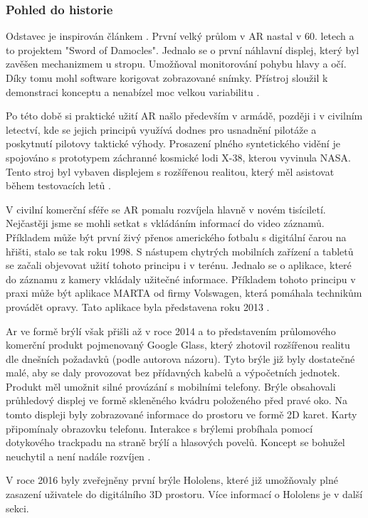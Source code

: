 \subsubsection{Pohled do historie}
Odstavec je inspirován článkem \cite{historyAr}. První velký průlom v AR nastal v 60. letech a to projektem "Sword of Damocles". Jednalo se o první náhlavní displej, který byl zavěšen mechanizmem u stropu. Umožňoval monitorování pohybu hlavy a očí. Díky tomu mohl software korigovat zobrazované snímky. Přístroj sloužil k demonstraci konceptu a nenabízel moc velkou variabilitu \cite{Kniha1GreengardSamuel2019Vr}.

Po této době si praktické užití AR našlo především v armádě, později i v civilním letectví, kde se jejich principů využívá dodnes pro usnadnění pilotáže a poskytnutí pilotovy taktické výhody. Prosazení plného syntetického vidění je spojováno s prototypem záchranné kosmické lodi X-38, kterou vyvinula NASA. Tento stroj byl vybaven displejem s rozšířenou realitou, který měl asistovat během testovacích letů \cite{delgado2001hybrid}.

V civilní komerční sféře se AR pomalu rozvíjela hlavně v novém tisíciletí. Nejčastěji jsme se mohli setkat s vkládáním informací do video záznamů. Příkladem může být první živý přenos amerického fotbalu s digitální čarou na hřišti, stalo se tak roku 1998. S nástupem chytrých mobilních zařízení a tabletů se začali objevovat užití tohoto principu i v terénu. Jednalo se o aplikace, které do záznamu z kamery vkládaly užitečné informace. Příkladem tohoto principu v praxi může být aplikace MARTA od firmy Volswagen, která pomáhala technikům provádět opravy. Tato aplikace byla představena roku 2013 \cite{MartaArt}.

Ar ve formě brýlí však přišli až v roce 2014 a to představením průlomového komerční produkt pojmenovaný Google Glass, který zhotovil rozšířenou realitu dle dnešních požadavků (podle autorova názoru). Tyto brýle již byly dostatečné malé, aby se daly provozovat bez přídavných kabelů a výpočetních jednotek. Produkt měl umožnit silné provázání s mobilními telefony. Brýle obsahovali průhledový displej ve formě skleněného kvádru položeného před pravé oko. 
Na tomto displeji byly zobrazované informace do prostoru ve formě 2D karet. Karty připomínaly obrazovku telefonu. Interakce s brýlemi probíhala pomocí dotykového trackpadu na straně brýlí a hlasových povelů. Koncept se bohužel neuchytil a není nadále rozvíjen \cite{GoogleGlass}.

V roce 2016 byly zveřejněny první brýle Hololens, které již umožňovaly plné zasazení uživatele do digitálního 3D prostoru. Více informací o Hololens je v další sekci.

